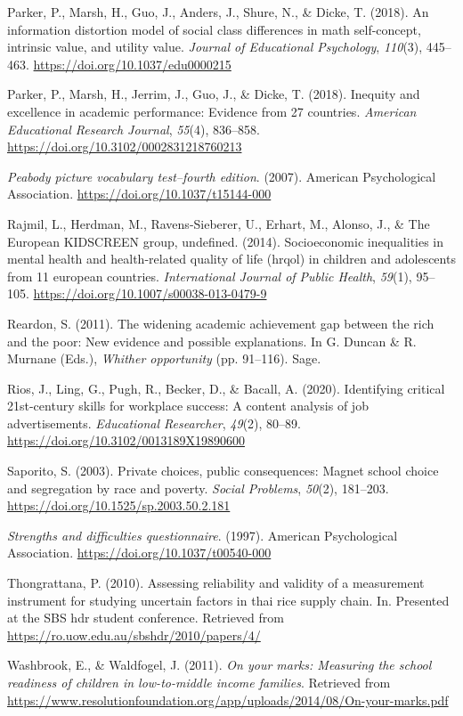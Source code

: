\documentclass[
  english,
  man]{apa6}
\newlength{\cslhangindent}
\newenvironment{cslreferences}%
  {\setlength{\parindent}{0pt}%
  \everypar{\setlength{\hangindent}{\cslhangindent}}\ignorespaces}%
  {\par}
\begin{document}
\begin{cslreferences}
\leavevmode\hypertarget{ref-parker_information_2018}{}%
Parker, P., Marsh, H., Guo, J., Anders, J., Shure, N., \& Dicke, T. (2018). An information distortion model of social class differences in math self-concept, intrinsic value, and utility value. \emph{Journal of Educational Psychology}, \emph{110}(3), 445--463. \url{https://doi.org/10.1037/edu0000215}

\leavevmode\hypertarget{ref-parker2018}{}%
Parker, P., Marsh, H., Jerrim, J., Guo, J., \& Dicke, T. (2018). Inequity and excellence in academic performance: Evidence from 27 countries. \emph{American Educational Research Journal}, \emph{55}(4), 836--858. \url{https://doi.org/10.3102/0002831218760213}

\leavevmode\hypertarget{ref-dunn2007}{}%
\emph{Peabody picture vocabulary test--fourth edition}. (2007). American Psychological Association. \url{https://doi.org/10.1037/t15144-000}

\leavevmode\hypertarget{ref-rajmil2014}{}%
Rajmil, L., Herdman, M., Ravens-Sieberer, U., Erhart, M., Alonso, J., \& The European KIDSCREEN group, undefined. (2014). Socioeconomic inequalities in mental health and health-related quality of life (hrqol) in children and adolescents from 11 european countries. \emph{International Journal of Public Health}, \emph{59}(1), 95--105. \url{https://doi.org/10.1007/s00038-013-0479-9}

\leavevmode\hypertarget{ref-reardon2011}{}%
Reardon, S. (2011). The widening academic achievement gap between the rich and the poor: New evidence and possible explanations. In G. Duncan \& R. Murnane (Eds.), \emph{Whither opportunity} (pp. 91--116). Sage.

\leavevmode\hypertarget{ref-rios2020}{}%
Rios, J., Ling, G., Pugh, R., Becker, D., \& Bacall, A. (2020). Identifying critical 21st-century skills for workplace success: A content analysis of job advertisements. \emph{Educational Researcher}, \emph{49}(2), 80--89. \url{https://doi.org/10.3102/0013189X19890600}

\leavevmode\hypertarget{ref-saporito2003}{}%
Saporito, S. (2003). Private choices, public consequences: Magnet school choice and segregation by race and poverty. \emph{Social Problems}, \emph{50}(2), 181--203. \url{https://doi.org/10.1525/sp.2003.50.2.181}

\leavevmode\hypertarget{ref-goodman1997}{}%
\emph{Strengths and difficulties questionnaire}. (1997). American Psychological Association. \url{https://doi.org/10.1037/t00540-000}

\leavevmode\hypertarget{ref-thongrattana2010}{}%
Thongrattana, P. (2010). Assessing reliability and validity of a measurement instrument for studying uncertain factors in thai rice supply chain. In. Presented at the SBS hdr student conference. Retrieved from \url{https://ro.uow.edu.au/sbshdr/2010/papers/4/}

\leavevmode\hypertarget{ref-washbrook2011}{}%
Washbrook, E., \& Waldfogel, J. (2011). \emph{On your marks: Measuring the school readiness of children in low-to-middle income families}. Retrieved from \url{https://www.resolutionfoundation.org/app/uploads/2014/08/On-your-marks.pdf}
\end{cslreferences}

\endgroup
\end{document}
